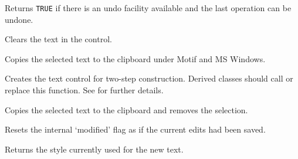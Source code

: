 Returns {\tt TRUE} if there is an undo facility available and the last operation
can be undone.

\label{wxtextctrlclear}


Clears the text in the control.

\label{wxtextctrlcopy}


Copies the selected text to the clipboard under Motif and MS Windows.

\label{wxtextctrlcreate}


Creates the text control for two-step construction. Derived classes
should call or replace this function. See \rtfsp
for further details.

\label{wxtextctrlcut}


Copies the selected text to the clipboard and removes the selection.



Resets the internal `modified' flag as if the current edits had been saved.

\label{wxtextctrlgetdefaultstyle}


Returns the style currently used for the new text.



\label{wxtextctrlgetinsertionpoint}


